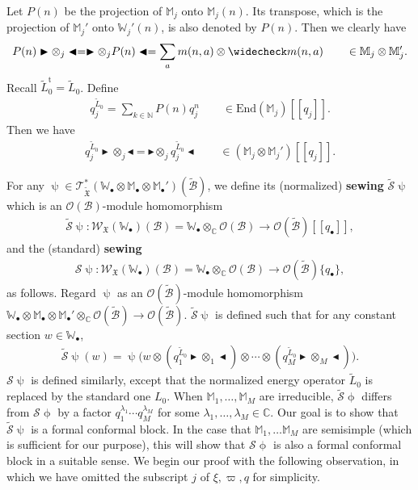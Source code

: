 \documentclass[12pt,b5paper,notitlepage]{report}
\theoremstyle{definition}
\theoremstyle{plain}
\newcommand{\fk}{\mathfrak}
\newcommand{\mc}{\mathcal}
\newcommand{\wtd}{\widetilde}
\newcommand{\wch}{\widecheck}
\newcommand{\tr}{\mathrm{t}} %
\newcommand{\End}{\mathrm{End}} %
\newcommand{\scr}{\mathscr}
\newcommand{\blt}{\bullet}
\newcommand{\Wbb}{\mathbb W}
\newcommand{\Mbb}{\mathbb M}
\newcommand{\Cbb}{\mathbb C}
\newcommand{\Nbb}{\mathbb N}
\newcommand{\btl}{\blacktriangleleft}
\newcommand{\btr}{\blacktriangleright}
\numberwithin{equation}{section}
\begin{document}
Let $P(n)$ be the projection of $\Mbb_j$ onto $\Mbb_j(n)$. Its transpose, which is the projection of $\Mbb_j'$ onto $\Wbb_j'(n)$, is also denoted by $P(n)$. Then we clearly have
\begin{align*}
P(n)\btr\otimes_j\btl=\btr\otimes_j P(n)\btl=\sum_am(n,a)\otimes\wch m(n,a)\qquad\in\Mbb_j\otimes\Mbb_j'.
\end{align*}
Recall $\wtd L_0^\tr=\wtd L_0$. Define
\begin{align}
q_j^{\wtd L_0}=\sum_{k\in\Nbb}P(n)q_j^n\qquad\in\End(\Mbb_j)[[q_j]].
\end{align} 
Then we have
\begin{align}
q_j^{\wtd L_0}\btr\otimes_j\btl=\btr\otimes_j q_j^{\wtd L_0} \btl\qquad \in (\Mbb_j\otimes\Mbb_j')[[q_j]].\label{eq109}
\end{align}

For any $\uppsi\in\scr T_{\wtd{\fk X}}^*(\Wbb_\blt\otimes\Mbb_\blt\otimes\Mbb_\blt')(\wtd{\mc B})$, we define its (normalized) \textbf{sewing} $\wtd{\mc S}\uppsi$ which is an $\scr O(\mc B)$-module homomorphism \index{S@$\wtd{\mc S}\uppsi,\mc S\uppsi$}
\begin{align*}
\wtd{\mc S}\uppsi:\scr W_{\fk X}(\Wbb_\blt)(\mc B)=\Wbb_\blt\otimes_\Cbb\scr O(\mc B)\rightarrow\scr O(\wtd{\mc B})[[q_\blt]],
\end{align*}
and the (standard) \textbf{sewing}
\begin{align*}
\mc S\uppsi:\scr W_{\fk X}(\Wbb_\blt)(\mc B)=\Wbb_\blt\otimes_\Cbb\scr O(\mc B)\rightarrow\scr O(\wtd{\mc B})\{q_\blt\},
\end{align*}
as follows. Regard $\uppsi$ as an $\scr O(\wtd{\mc B})$-module homomorphism $\Wbb_\blt\otimes\Mbb_\blt\otimes\Mbb_\blt'\otimes_\Cbb\scr O(\wtd{\mc B})\rightarrow \scr O(\wtd{\mc B})$. $\wtd{\mc S}\uppsi$ is defined such that for any constant section $w\in\Wbb_\blt$,
\begin{align}
\wtd{\mc S}\uppsi(w)=\uppsi\Big(w\otimes (q_1^{\wtd L_0}\btr\otimes_1\btl)\otimes\cdots\otimes (q_M^{\wtd L_0}\btr\otimes_M\btl)\Big).
\end{align}
$\mc S\uppsi$ is defined similarly, except that the normalized energy operator $\wtd L_0$ is replaced by the standard one $L_0$. When $\Mbb_1,\dots,\Mbb_M$ are irreducible, $\wtd{\mc S}\upphi$ differs from $\mc S\upphi$ by a factor $q_1^{\lambda_1}\cdots q_M^{\lambda_M}$ for some $\lambda_1,\dots,\lambda_M\in\Cbb$. Our goal is to show that $\wtd{\mc S}\uppsi$ is a formal conformal block. In the case that $\Mbb_1,\dots \Mbb_M$ are semisimple (which is sufficient for our purpose), this will show that $\mc S\upphi$ is also a formal conformal block in a suitable sense. We begin our proof with the following observation, in which we have omitted the subscript $j$ of $\xi,\varpi,q$ for simplicity.
\end{document}

